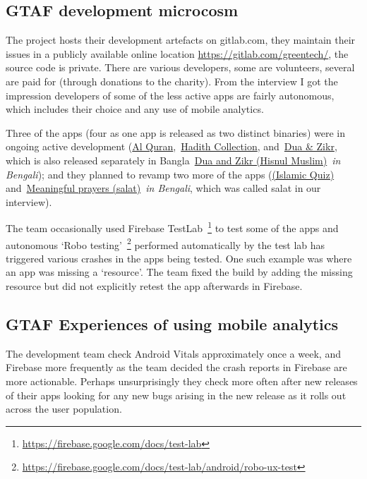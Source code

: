 \subsection{GTAF development microcosm}
The project hosts their development artefacts on gitlab.com, they maintain their issues in a publicly available online location \url{https://gitlab.com/greentech/}, the source code is private. There are various developers, some are volunteers, several are paid for (through donations to the charity). From the interview I got the impression developers of some of the less active apps are fairly autonomous, which includes their choice and any use of mobile analytics. 

Three of the apps (four as one app is released as two distinct binaries) were in ongoing active development (\href{https://play.google.com/store/apps/details?id=com.greentech.quran}{Al Quran},~\href{https://play.google.com/store/apps/details?id=com.greentech.hadith}{Hadith Collection}, and~\href{https://play.google.com/store/apps/details?id=com.greentech.hisnulmuslim}{Dua \& Zikr}, which is also released separately in Bangla~\href{https://play.google.com/store/apps/details?id=com.greentech.hisnulmuslimbn}{{Dua and Zikr (Hisnul Muslim)}}~\emph{in Bengali}); and they planned to revamp two more of the apps (\href{https://play.google.com/store/apps/details?id=com.greentech.islamicquiz}{(Islamic Quiz)} and~\href{https://play.google.com/store/apps/details?id=com.greentech.salatbn}{Meaningful prayers (salat)}~\textit{in Bengali}, which was called salat in our interview).

The team occasionally used Firebase TestLab~\footnote{\url{https://firebase.google.com/docs/test-lab}} to test some of the apps and autonomous `Robo testing'~\footnote{\url{https://firebase.google.com/docs/test-lab/android/robo-ux-test}} performed automatically by the test lab has triggered various crashes in the apps being tested. One such example was where an app was missing a `resource'. The team fixed the build by adding the missing resource but did not explicitly retest the app afterwards in Firebase.  

\subsection{GTAF Experiences of using mobile analytics}
The development team check Android Vitals approximately once a week, and Firebase more frequently as the team decided the crash reports in Firebase are more actionable. Perhaps unsurprisingly they check more often after new releases of their apps looking for any new bugs arising in the new release as it rolls out across the user population.

